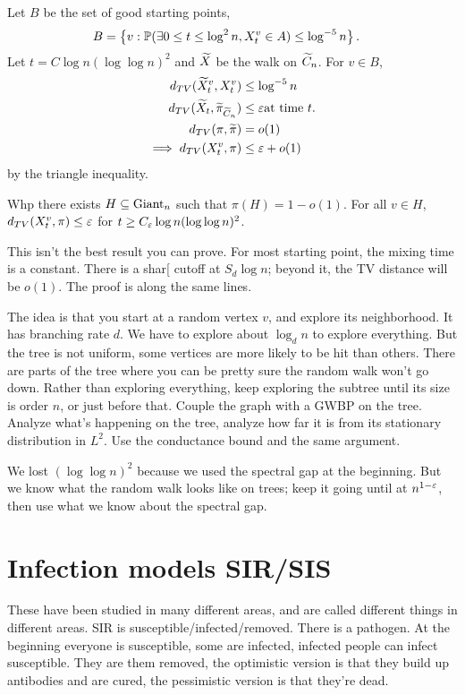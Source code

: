 Let $B$ be the set of good starting points,
\begin{align}
B&=\left\{{v}:{\mathbb{P}(\exists 0\le t\le \log^2 n, X_t^v\in A)\le \log^{-5}n}\right\}.
\end{align}
Let $t=C\log n(\log \log n)^2$ and $\widetilde{X}$ be the walk on $\widetilde{C}_n$. For $v\in B$,
\begin{align}
d_{TV}(\widetilde{X}_t^v, X_t^v) &\le \log^{-5}n\\
d_{TV}(\widetilde{X}_t, \widetilde{\pi}_{\widetilde{C}_n})&\le \varepsilon\text{at time $t$.}\\
d_{TV}(\pi, \widetilde{\pi}) &=o(1)\\
\implies 
d_{TV}(X_t^v, \pi) &\le \varepsilon + o(1)
\end{align}
by the triangle inequality.
\begin{thm}
Whp there exists $H\subseteq \text{Giant}_n$ such that $\pi(H)=1-o(1)$. For all $v\in H$, $d_{TV}(X_t^v, \pi)\le \varepsilon$ for $t\ge C_\varepsilon \log n (\log \log n)^2$. 
\end{thm}
This isn't the best result you can prove. For most starting point, the mixing time is a constant. There is a shar[ cutoff at $S_d\log n$; beyond it, the TV distance will be $o(1)$. The proof is along the same lines.

The idea is that you start at a random vertex $v$, and explore its neighborhood. It has branching rate $d$. We have to explore about $\log_d n$ to explore everything. But the tree is not uniform, some vertices are more likely to be hit than others. There are parts of the tree where you can be pretty sure the random walk won't go down. Rather than exploring everything, keep exploring the subtree until its size is order $n$, or just before that. Couple the graph with a GWBP on the tree. Analyze what's happening on the tree, analyze how far it is from its stationary distribution in $L^2$. Use the conductance bound and the same argument.

We lost $(\log\log n)^2$ because we used the spectral gap at the beginning. But we know what the random walk looks like on trees; keep it going until at $n^{1-\varepsilon}$, then use what we know about the spectral gap.

\section{Infection models SIR/SIS}
These have been studied in many different areas, and are called different things in different areas.
SIR is susceptible/infected/removed. There is a pathogen. At the beginning everyone is susceptible, some are infected, infected people can infect susceptible. They are them removed, the optimistic version is that they build up antibodies and are cured, the pessimistic version is that they're dead.


